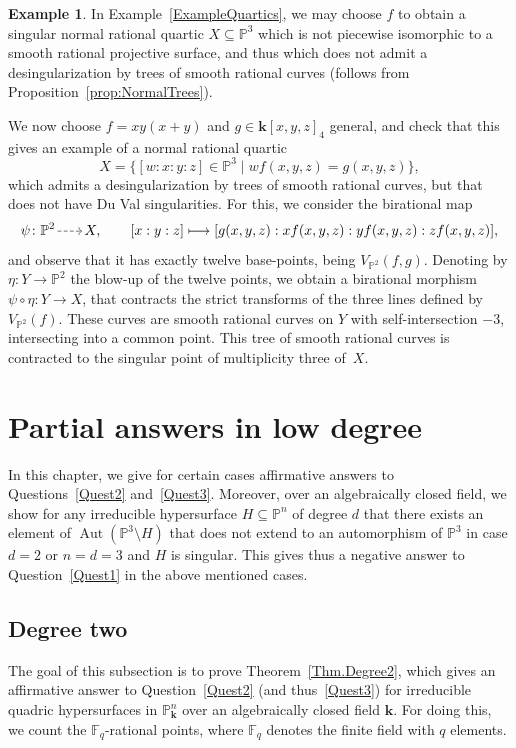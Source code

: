 \documentclass[JEP,XML,SOM,Unicode,NoFloatCountersInSection,published]{cedram}
\newcommand\mto{\mathchoice{\longmapsto}{\mapsto}{\mapsto}{\mapsto}}
\newcommand{\dradpl}{{\hspace*{-2.5mm}\begin{tikzcd}[ampersand replacement=\&,column sep = scriptsize]\mbox{}\ar[r,dashed]\&\mbox{}\end{tikzcd}\hspace*{-2.5mm}}}
\newcommand{\dratst}{{\hspace*{-2.5mm}\begin{tikzcd}[ampersand replacement=\&,column sep = small]\mbox{}\ar[r,dashed]\&\mbox{}\end{tikzcd}\hspace*{-2mm}}}
\let\drascst\dratst
\newcommand{\dra}{\mathchoice{\dradpl}{\dratst}{\drascst}{\drascst}}
\theoremstyle{definition}
\newtheorem{example}[lemma]{Example}
\renewcommand\k{{\mathbf k}}
\newcommand\p{{\mathbb P}}\let\PP\p
\newcommand\FF{{\mathbb F}}
\newcommand{\kk}{\mathbf{k}}
\DeclareMathOperator{\Aut}{Aut}
\begin{document}
\begin{example} In Example~\ref{ExampleQuartics}, we may choose $f$ to obtain a singular normal rational quartic $X\subseteq \p^3$ which is not piecewise isomorphic to a smooth rational projective surface, and thus which does not admit a desingularization by trees of smooth rational curves (follows from Proposition~\ref{prop:NormalTrees}).

We now choose $f=xy(x+y)$ and $g\in \k[x,y,z]_4$ general, and check that this gives an example of a normal rational quartic
\[
X=\{[w:x:y:z]\in \p^3\mid wf(x,y,z)=g(x,y,z)\},
\]
which admits a desingularization by trees of smooth rational curves, but that does not have Du Val singularities. For this, we consider the birational map
\[
\psi\colon \p^2\dra X,\qquad [x:y:z]\mto [g(x,y,z):xf(x,y,z):yf(x,y,z):zf(x,y,z)],
\]
and observe that it has exactly twelve base-points, being $V_{\p^2}(f,g)$. Denoting by $\eta\colon Y\to \p^2$ the blow-up of the twelve points, we obtain a birational morphism $\psi\circ \eta\colon Y\to X$, that contracts the strict transforms of the three lines defined by $V_{\p^2}(f)$. These curves are smooth rational curves on $Y$ with self-intersection $-3$, inter\-secting into a common point. This tree of smooth rational curves is contracted to the singular point of multiplicity three of~$X$.
\end{example}
\section{Partial answers in low degree}

In this chapter, we give for certain cases affirmative answers to Questions~\eqref{Quest2} and~\eqref{Quest3}.
Moreover, over an algebraically closed field,
we show for any irreducible hypersurface $H \subseteq \PP^n$ of degree $d$
that there exists an element of $\Aut(\PP^3 \setminus H)$ that does not extend to
an automorphism of $\PP^3$
in case $d = 2$ or $n=d=3$ and $H$ is singular.
This gives thus a negative answer to Question~\eqref{Quest1} in the above mentioned cases.

\subsection{Degree two}
\label{Subsec.Degree2}
The goal of this subsection is to prove Theorem~\ref{Thm.Degree2}, which gives an
affirmative answer to Question~\eqref{Quest2} (and thus~\eqref{Quest3}) for
irreducible quadric hypersurfaces in $\PP^n_{\kk}$ over an algebraically closed field $\kk$.
For doing this, we count the $\FF_q$-rational points, where $\FF_q$ denotes the finite field with $q$
elements.
\end{document}
